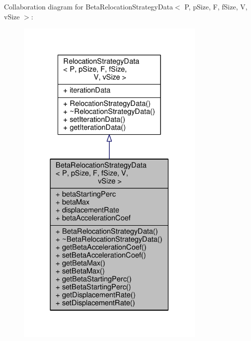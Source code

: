 Collaboration diagram for Beta\+Relocation\+Strategy\+Data$<$ P, p\+Size, F, f\+Size, V, v\+Size $>$\+:\nopagebreak
\begin{figure}[H]
\begin{center}
\leavevmode
\includegraphics[width=258pt]{structBetaRelocationStrategyData__coll__graph}
\end{center}
\end{figure}
